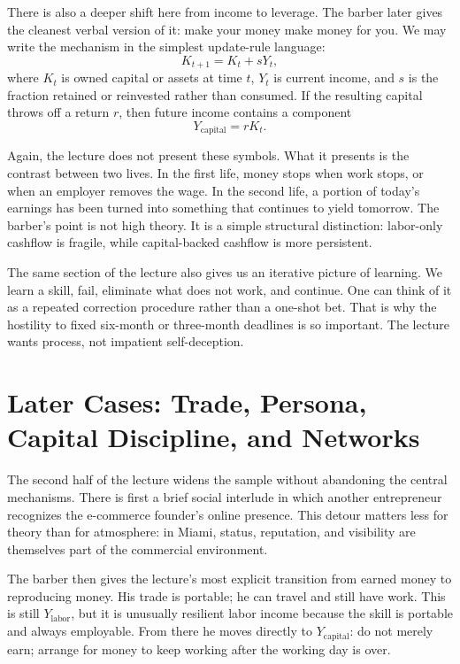 There is also a deeper shift here from income to leverage. The barber later gives the cleanest verbal version of it: make your money make money for you. We may write the mechanism in the simplest update-rule language:
\begin{equation}
K_{t+1} = K_t + sY_t,
\end{equation}
where \(K_t\) is owned capital or assets at time \(t\), \(Y_t\) is current income, and \(s\) is the fraction retained or reinvested rather than consumed. If the resulting capital throws off a return \(r\), then future income contains a component
\begin{equation}
Y_{\mathrm{capital}} = rK_t.
\end{equation}

Again, the lecture does not present these symbols. What it presents is the contrast between two lives. In the first life, money stops when work stops, or when an employer removes the wage. In the second life, a portion of today's earnings has been turned into something that continues to yield tomorrow. The barber's point is not high theory. It is a simple structural distinction: labor-only cashflow is fragile, while capital-backed cashflow is more persistent.

The same section of the lecture also gives us an iterative picture of learning. We learn a skill, fail, eliminate what does not work, and continue. One can think of it as a repeated correction procedure rather than a one-shot bet. That is why the hostility to fixed six-month or three-month deadlines is so important. The lecture wants process, not impatient self-deception.

\section{Later Cases: Trade, Persona, Capital Discipline, and Networks}

The second half of the lecture widens the sample without abandoning the central mechanisms. There is first a brief social interlude in which another entrepreneur recognizes the e-commerce founder's online presence. This detour matters less for theory than for atmosphere: in Miami, status, reputation, and visibility are themselves part of the commercial environment.

The barber then gives the lecture's most explicit transition from earned money to reproducing money. His trade is portable; he can travel and still have work. This is still \(Y_{\mathrm{labor}}\), but it is unusually resilient labor income because the skill is portable and always employable. From there he moves directly to \(Y_{\mathrm{capital}}\): do not merely earn; arrange for money to keep working after the working day is over.

